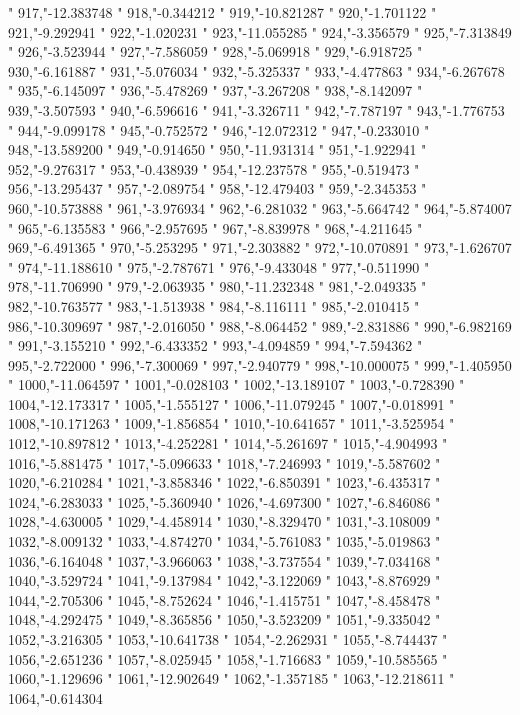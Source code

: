 "
917,"-12.383748
"
918,"-0.344212
"
919,"-10.821287
"
920,"-1.701122
"
921,"-9.292941
"
922,"-1.020231
"
923,"-11.055285
"
924,"-3.356579
"
925,"-7.313849
"
926,"-3.523944
"
927,"-7.586059
"
928,"-5.069918
"
929,"-6.918725
"
930,"-6.161887
"
931,"-5.076034
"
932,"-5.325337
"
933,"-4.477863
"
934,"-6.267678
"
935,"-6.145097
"
936,"-5.478269
"
937,"-3.267208
"
938,"-8.142097
"
939,"-3.507593
"
940,"-6.596616
"
941,"-3.326711
"
942,"-7.787197
"
943,"-1.776753
"
944,"-9.099178
"
945,"-0.752572
"
946,"-12.072312
"
947,"-0.233010
"
948,"-13.589200
"
949,"-0.914650
"
950,"-11.931314
"
951,"-1.922941
"
952,"-9.276317
"
953,"-0.438939
"
954,"-12.237578
"
955,"-0.519473
"
956,"-13.295437
"
957,"-2.089754
"
958,"-12.479403
"
959,"-2.345353
"
960,"-10.573888
"
961,"-3.976934
"
962,"-6.281032
"
963,"-5.664742
"
964,"-5.874007
"
965,"-6.135583
"
966,"-2.957695
"
967,"-8.839978
"
968,"-4.211645
"
969,"-6.491365
"
970,"-5.253295
"
971,"-2.303882
"
972,"-10.070891
"
973,"-1.626707
"
974,"-11.188610
"
975,"-2.787671
"
976,"-9.433048
"
977,"-0.511990
"
978,"-11.706990
"
979,"-2.063935
"
980,"-11.232348
"
981,"-2.049335
"
982,"-10.763577
"
983,"-1.513938
"
984,"-8.116111
"
985,"-2.010415
"
986,"-10.309697
"
987,"-2.016050
"
988,"-8.064452
"
989,"-2.831886
"
990,"-6.982169
"
991,"-3.155210
"
992,"-6.433352
"
993,"-4.094859
"
994,"-7.594362
"
995,"-2.722000
"
996,"-7.300069
"
997,"-2.940779
"
998,"-10.000075
"
999,"-1.405950
"
1000,"-11.064597
"
1001,"-0.028103
"
1002,"-13.189107
"
1003,"-0.728390
"
1004,"-12.173317
"
1005,"-1.555127
"
1006,"-11.079245
"
1007,"-0.018991
"
1008,"-10.171263
"
1009,"-1.856854
"
1010,"-10.641657
"
1011,"-3.525954
"
1012,"-10.897812
"
1013,"-4.252281
"
1014,"-5.261697
"
1015,"-4.904993
"
1016,"-5.881475
"
1017,"-5.096633
"
1018,"-7.246993
"
1019,"-5.587602
"
1020,"-6.210284
"
1021,"-3.858346
"
1022,"-6.850391
"
1023,"-6.435317
"
1024,"-6.283033
"
1025,"-5.360940
"
1026,"-4.697300
"
1027,"-6.846086
"
1028,"-4.630005
"
1029,"-4.458914
"
1030,"-8.329470
"
1031,"-3.108009
"
1032,"-8.009132
"
1033,"-4.874270
"
1034,"-5.761083
"
1035,"-5.019863
"
1036,"-6.164048
"
1037,"-3.966063
"
1038,"-3.737554
"
1039,"-7.034168
"
1040,"-3.529724
"
1041,"-9.137984
"
1042,"-3.122069
"
1043,"-8.876929
"
1044,"-2.705306
"
1045,"-8.752624
"
1046,"-1.415751
"
1047,"-8.458478
"
1048,"-4.292475
"
1049,"-8.365856
"
1050,"-3.523209
"
1051,"-9.335042
"
1052,"-3.216305
"
1053,"-10.641738
"
1054,"-2.262931
"
1055,"-8.744437
"
1056,"-2.651236
"
1057,"-8.025945
"
1058,"-1.716683
"
1059,"-10.585565
"
1060,"-1.129696
"
1061,"-12.902649
"
1062,"-1.357185
"
1063,"-12.218611
"
1064,"-0.614304
